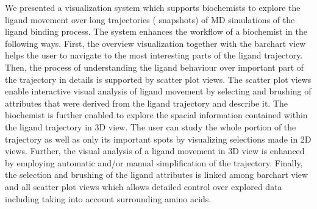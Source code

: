 We presented a visualization system which supports biochemists to explore the ligand movement over long trajectories ( snapshots) of MD simulations of the ligand binding process.
The system enhances the workflow of a biochemist in the following ways.
First, the overview visualization together with the barchart view helps the user to navigate to the most interesting parts of
the ligand trajectory.
Then, the process of understanding the ligand behaviour over important part of the trajectory in details is supported by scatter plot views.
The scatter plot views enable interactive visual analysis of ligand movement by selecting and brushing of attributes that were derived from the ligand trajectory and describe it.
The biochemist is further enabled to explore the spacial information contained within the ligand trajectory in 3D view.
The user can study the whole portion of the trajectory as well as only its important spots by visualizing selections made in 2D views.
Further, the visual analysis of a ligand movement in 3D view is enhanced by employing automatic and/or manual simplification of the trajectory.
Finally, the selection and brushing of the ligand attributes is linked among barchart view and all scatter plot views which allows detailed control over explored data including taking into account surrounding amino acids.